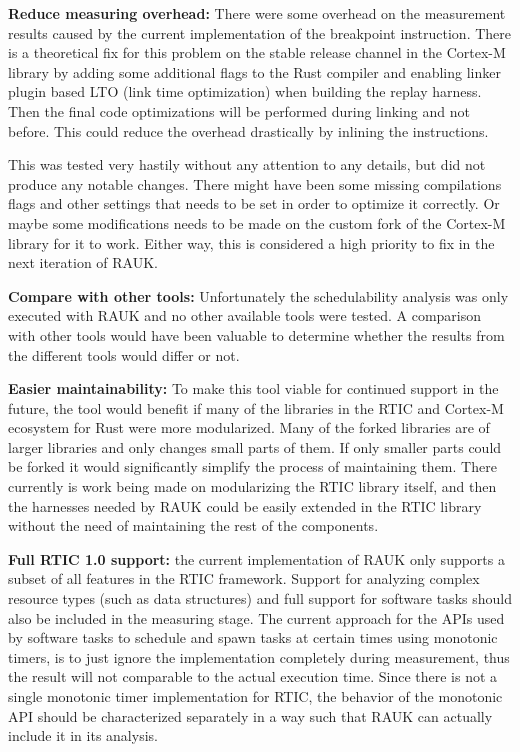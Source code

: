 \textbf{Reduce measuring overhead:} There were some overhead on the measurement
results caused by the current implementation of the breakpoint instruction.
There is a theoretical fix for this problem on the stable release channel in
the Cortex-M library by adding some additional flags to the Rust compiler and
enabling linker plugin based LTO (link time optimization) when building the
replay harness. Then the final code optimizations will be performed during
linking and not before. This could reduce the overhead drastically by inlining
the instructions. 

This was tested very hastily without any attention to any details, but did not
produce any notable changes. There might have been some missing compilations
flags and other settings that needs to be set in order to optimize it
correctly. Or maybe some modifications needs to be made on the custom fork of
the Cortex-M library for it to work. Either way, this is considered a high
priority to fix in the next iteration of RAUK\@.

\textbf{Compare with other tools:} Unfortunately the schedulability analysis
was only executed with RAUK and no other available tools were tested. A
comparison with other tools would have been valuable to determine whether the
results from the different tools would differ or not. 

\textbf{Easier maintainability:} To make this tool viable for continued support
in the future, the tool would benefit if many of the libraries in the RTIC and
Cortex-M ecosystem for Rust were more modularized. Many of the forked libraries
are of larger libraries and only changes small parts of them. If only smaller
parts could be forked it would significantly simplify the process of
maintaining them. There currently is work being made on modularizing the RTIC
library itself, and then the harnesses needed by RAUK could be easily extended
in the RTIC library without the need of maintaining the rest of the components.

\textbf{Full RTIC 1.0 support:} the current implementation of RAUK only supports
a subset of all features in the RTIC framework. Support for analyzing complex
resource types (such as data structures) and full support for software tasks
should also be included in the measuring stage. The current approach for the APIs
used by software tasks to schedule and spawn tasks at certain times using
monotonic timers, is to just ignore the implementation completely during
measurement, thus the result will not comparable to the actual execution time.
Since there is not a single monotonic timer implementation for RTIC, the
behavior of the monotonic API should be characterized separately in a way such
that RAUK can actually include it in its analysis.

